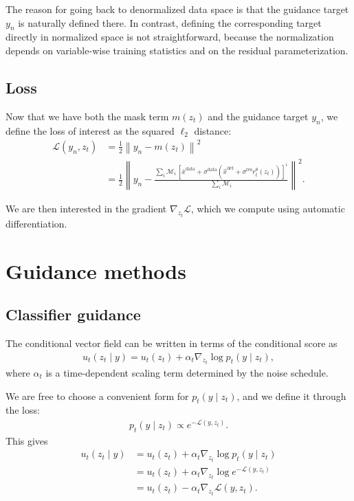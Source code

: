 \documentclass[a4paper,12pt]{article}
\begin{document}
The reason for going back to denormalized data space is that the guidance target $y_n$ is naturally defined there.
In contrast, defining the corresponding target directly in normalized space is not straightforward, because the normalization depends on variable-wise training statistics and on the residual parameterization.

\subsection{Loss}

Now that we have both the mask term $m(z_t)$ and the guidance target $y_n$, we define the loss of interest as the squared $\ell_2$ distance:
\begin{align*} 
    \mathcal{L}(y_n, z_t) &= \frac{1}{2} \left\lVert y_n - m(z_t) \right\rVert^2 \\
    &= \frac{1}{2} \left\lVert
    y_n -
    \frac{\sum_i \mathcal{M}_i \, [\bar{x}^{\text{data}} + \sigma^{\text{data}}(\hat{x}^{\text{det}} + \sigma^{\text{res}} r_t^\theta(z_t))]^i}{\sum_i \mathcal{M}_i}
    \right\rVert^2.
\end{align*}

We are then interested in the gradient $\nabla_{z_t}\mathcal{L}$, which we compute using automatic differentiation.

\clearpage
\section{Guidance methods}
\subsection{Classifier guidance}

The conditional vector field can be written in terms of the conditional score as
\begin{align*}
     u_t(z_t \mid y) = u_t(z_t) + \alpha_t \nabla_{z_t} \log p_t(y \mid z_t),
\end{align*}
where $\alpha_t$ is a time-dependent scaling term determined by the noise schedule.

We are free to choose a convenient form for $p_t(y \mid z_t)$, and we define it through the loss:
\begin{align*}
    p_t(y \mid z_t) \propto e^{-\mathcal{L}(y, z_t)}.
\end{align*}
This gives
\begin{align*}
    u_t(z_t \mid y)
    &= u_t(z_t) + \alpha_t \nabla_{z_t} \log p_t(y \mid z_t) \\
    &= u_t(z_t) + \alpha_t \nabla_{z_t} \log e^{-\mathcal{L}(y, z_t)} \\
    &= u_t(z_t) - \alpha_t \nabla_{z_t} \mathcal{L}(y, z_t).
\end{align*}
\end{document}
